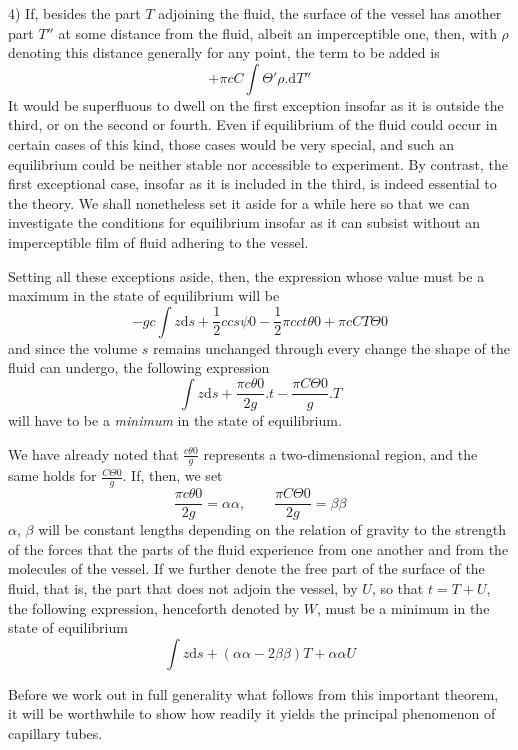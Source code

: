 4) If, besides the part $T$ adjoining the fluid, the surface of the vessel has another part $T''$ at some distance from the fluid, albeit an imperceptible one, then, with $\rho$ denoting this distance generally for any point, the term to be added is
\[
+\pi cC\int\Theta'\rho.\mathrm{d}T''
\]
It would be superfluous to dwell on the first exception insofar as it is outside the third, or on the second or fourth. Even if equilibrium of the fluid could occur in certain cases of this kind, those cases would be very special, and such an equilibrium could be neither stable nor accessible to experiment. By contrast, the first exceptional case, insofar as it is included in the third, is indeed essential to the theory. We shall nonetheless set it aside for a while here so that we can investigate the conditions for equilibrium insofar as it can subsist without an imperceptible film of fluid adhering to the vessel.

Setting all these exceptions aside, then, the expression whose value must be a maximum in the state of equilibrium will be
\[
-gc\int z\mathrm{d}s+\frac12ccs\psi0-\frac12\pi cct\theta0+\pi cCT\Theta0
\]
and since the volume $s$ remains unchanged through every change the shape of the fluid can undergo, the following expression
\[
\int z\mathrm{d}s+\frac{\pi c\theta0}{2g}.t-\frac{\pi C\Theta0}{g}.T
\]
will have to be a \textit{minimum} in the state of equilibrium.

We have already noted that $\frac{c\theta0}{g}$ represents a two-dimensional region, and the same holds for $\frac{C\Theta0}{g}$. If, then, we set
\[
\frac{\pi c\theta0}{2g}=\alpha\alpha,\qquad\frac{\pi C\Theta0}{2g}=\beta\beta
\]
$\alpha$, $\beta$ will be constant lengths depending on the relation of gravity to the strength of the forces that the parts of the fluid experience from one another and from the molecules of the vessel. If we further denote the free part of the surface of the fluid, that is, the part that does not adjoin the vessel, by $U$, so that $t=T+U$, the following expression, henceforth denoted by $W$, must be a minimum in the state of equilibrium
\[
\int z\mathrm{d}s+(\alpha\alpha-2\beta\beta)T+\alpha\alpha U
\]

Before we work out in full generality what follows from this important theorem, it will be worthwhile to show how readily it yields the principal phenomenon of capillary tubes.

